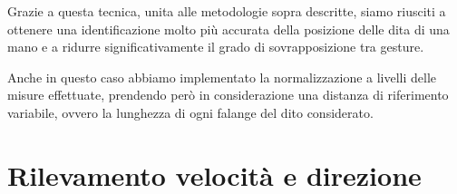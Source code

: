 Grazie a questa tecnica, unita alle metodologie sopra descritte, siamo riusciti a ottenere una identificazione molto più accurata della posizione delle dita di una mano e a ridurre significativamente il grado di sovrapposizione tra gesture.

Anche in questo caso abbiamo implementato la normalizzazione a livelli delle misure effettuate, prendendo però in considerazione una distanza di riferimento variabile, ovvero la lunghezza di ogni falange del dito considerato.

\section{Rilevamento velocità e direzione}




